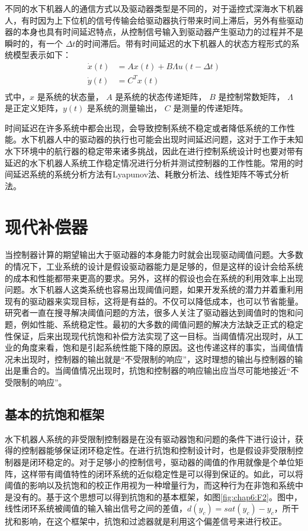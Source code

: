 不同的水下机器人的通信方式以及驱动器类型是不同的，对于遥控式深海水下机器人，有时因为上下位机的信号传输会给驱动器执行带来时间上滞后，另外有些驱动器的本身也具有时间延迟特点，从控制信号输入到驱动器产生驱动力的过程并不是瞬时的，有一个 $\Delta t$的时间滞后。带有时间延迟的水下机器人的状态方程形式的系统模型表示如下：
\begin{equation}
\label{eq:chap6:sat}
\begin{aligned}
 \dot x(t) &= A x(t) +  B \Lambda u(t - \Delta t) \\
 \dot y(t) &= C^T x(t)\\
\end{aligned}
\end{equation}
式中，$x$ 是系统的状态量， $A$ 是系统的状态传递矩阵， $B$ 是控制常数矩阵， $\Lambda$ 是正定义矩阵，$y(t)$ 是系统的测量输出， $C$ 是测量的传递矩阵。

时间延迟在许多系统中都会出现，会导致控制系统不稳定或者降低系统的工作性能。水下机器人中的驱动器的执行也可能会出现时间延迟问题，这对于工作于未知水下环境中的航行器的稳定带来诸多挑战，因此在进行控制系统设计时也要对带有延迟的水下机器人系统工作稳定情况进行分析并测试控制器的工作性能。常用的时间延迟系统的系统分析方法有Lyapunov法、耗散分析法、线性矩阵不等式分析法\cite{yuli2002,feng2016dissipativity,feng2015reachable}。

\section{现代补偿器}
当控制器计算的期望输出大于驱动器的本身能力时就会出现驱动阈值问题。大多数的情况下，工业系统的设计是假设驱动器能力是足够的，但是这样的设计会给系统的成本和性能都带来更高的要求。另外，这样的假设也会在系统的利用效率上出现问题。水下机器人这类系统也容易出现阈值问题，如果开发系统的潜力并着重利用现有的驱动器来实现目标，这将是有益的。不仅可以降低成本，也可以节省能量。研究者一直在搜寻解决阈值问题的方法，很多人关注了驱动器达到阈值时的饱和问题，例如性能、系统稳定性。最初的大多数的阈值问题的解决方法缺乏正式的稳定性保证，后来出现现代抗饱和补偿方法实现了这一目标。当阈值情况出现时，从工业的角度来看，饱和是引起系统性能下降的原因。这也传递这样的事实，当阈值情况未出现时，控制器的输出就是“不受限制的响应”，这时理想的输出与控制器的输出是重合的。当阈值情况出现时，抗饱和控制器的响应输出应当尽可能地接近“不受限制的响应”。
\subsection{基本的抗饱和框架 }

水下机器人系统的非受限制控制器是在没有驱动器饱和问题的条件下进行设计，获得的控制器能够保证闭环稳定性。在进行抗饱和控制设计时，也是假设非受限制控制器是闭环稳定的。对于足够小的控制信号，驱动器的阈值的作用就像是个单位矩阵，这样带有阈值特性的闭环系统的近似稳定性是可以得到保证的。如此，可以将阈值的影响以及抗饱和的校正作用视为一种增量行为，而这种行为在非饱和系统中是没有的。基于这个思想可以得到抗饱和的基本框架，如图\ref{fig:chap6:F2}。图中，线性闭环系统被阈值的输入输出信号之间的差值，$d(y_c) = sat(y_c) - y_c$，所干扰和影响，在这个框架中，抗饱和过滤器就是利用这个偏差信号来进行校正。

